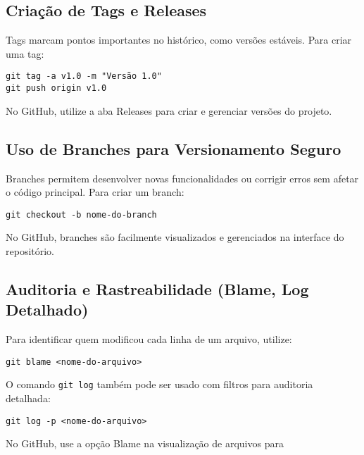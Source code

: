 \subsection{Criação de Tags e Releases}

Tags marcam pontos importantes no histórico, como versões estáveis. Para criar uma tag:

\begin{lstlisting}[style=shellstyle]
git tag -a v1.0 -m "Versão 1.0"
git push origin v1.0
\end{lstlisting}

No GitHub, utilize a aba Releases para criar e gerenciar versões do projeto.

\subsection{Uso de Branches para Versionamento Seguro}

Branches permitem desenvolver novas funcionalidades ou corrigir erros sem afetar o código principal. Para criar um branch:

\begin{lstlisting}[style=shellstyle]
git checkout -b nome-do-branch
\end{lstlisting}

No GitHub, branches são facilmente visualizados e gerenciados na interface do repositório.

\subsection{Auditoria e Rastreabilidade (Blame, Log Detalhado)}

Para identificar quem modificou cada linha de um arquivo, utilize:

\begin{lstlisting}[style=shellstyle]
git blame <nome-do-arquivo>
\end{lstlisting}

O comando \texttt{git log} também pode ser usado com filtros para auditoria detalhada:

\begin{lstlisting}[style=shellstyle]
git log -p <nome-do-arquivo>
\end{lstlisting}

No GitHub, use a opção Blame na visualização de arquivos para